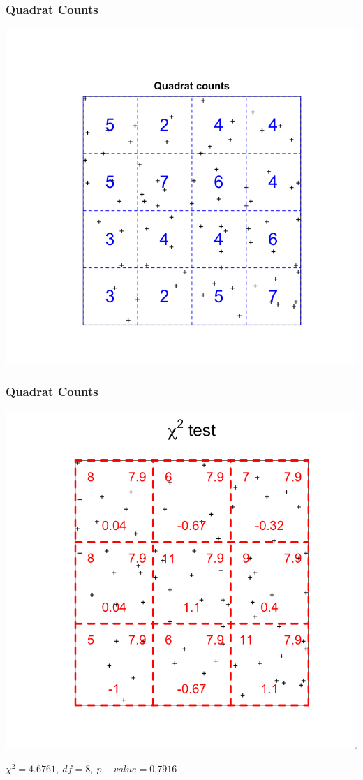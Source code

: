 \documentclass[nototal,handout]{beamer}
\begin{document}
\begin{frame}[<+->] 
    \frametitle{Quadrat Counts}
    \begin{center}
      \includegraphics[width=.65\linewidth]{quadrat_counts.png}
    \end{center}
  \end{frame}


\begin{frame}[<+->] 
    \frametitle{Quadrat Counts}
    \begin{center}
      \includegraphics[width=.55\linewidth]{chi_square.png}
    \end{center}
    $\chi^2=4.6761, \ df=8, \ p-value = 0.7916$
  \end{frame}
\end{document}
